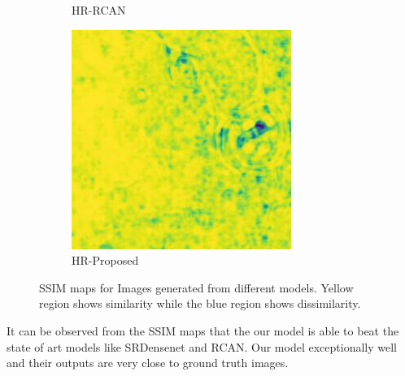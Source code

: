 \begin{figure}[H]
\begin{subfigure}[H]{0.275\textwidth}
    \caption{HR-RCAN}
  \end{subfigure}
  \begin{subfigure}[H]{0.275\textwidth}
    \includegraphics[width=\textwidth]{Chapter7/SSIM_proposed_445.jpg}
    \caption{HR-Proposed}
  \end{subfigure}

    
    \caption[SSIM maps for images generated form different models.] {SSIM maps for Images generated from different models. Yellow region shows similarity while the blue region shows dissimilarity.}
    \label{fig:label7.6}
\end{figure}




It can be observed from the SSIM maps that the our model is able to beat the state of art models like SRDensenet and RCAN. Our model exceptionally well and their outputs are very close to ground truth images.

